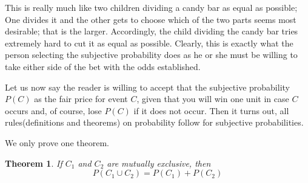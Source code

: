 \documentclass[a4paper]{book}
\newtheorem{theorem}{Theorem}[section]
\begin{document}
  This is really much like two children dividing a candy bar as equal as
  possible; One divides it and the other gets to choose which of the two
  parts seems most desirable; that is the larger. Accordingly, the child
  dividing the candy bar tries extremely hard to cut it as equal as
  possible. Clearly, this is exactly what the person selecting the
  subjective probability does as he or she must be willing to take
  either side of the bet with the odds established.

  Let us now say the reader is willing to accept that the subjective
  probability $P(C)$ as the fair price for event $C$, given that you
  will win one unit in case $C$ occurs and, of course, lose $P(C)$ if it
  does not occur. Then it turns out, all rules(definitions and theorems)
  on probability follow for subjective probabilities.

  We only prove one theorem.

  \begin{theorem}
    If $C_1$ and $C_2$ are mutually exclusive, then
    \begin{displaymath}
      P(C_1 \cup C_2) = P(C_1) + P(C_2)
    \end{displaymath}
  \end{theorem}
\end{document}
